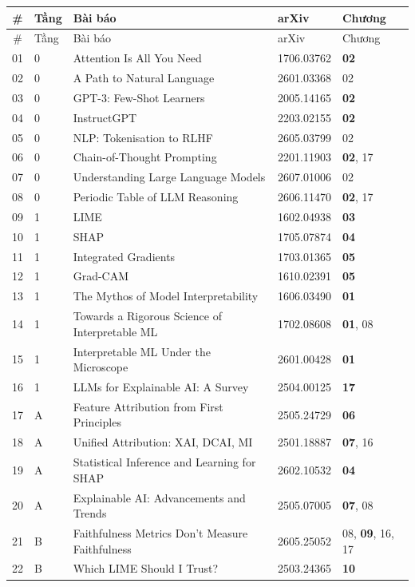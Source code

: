 \footnotesize
\begin{longtable}{@{}clllp{\danhmucwch}@{}}
\toprule
\# & Tầng & Bài báo & arXiv & Chương \\
\midrule
\endfirsthead
\toprule
\# & Tầng & Bài báo & arXiv & Chương \\
\midrule
\endhead
01 & 0 & Attention Is All You Need & 1706.03762 & \textbf{02} \\
02 & 0 & A Path to Natural Language & 2601.03368 & 02 \\
03 & 0 & GPT-3: Few-Shot Learners & 2005.14165 & \textbf{02} \\
04 & 0 & InstructGPT & 2203.02155 & \textbf{02} \\
05 & 0 & NLP: Tokenisation to RLHF & 2605.03799 & 02 \\
06 & 0 & Chain-of-Thought Prompting & 2201.11903 & \textbf{02}, 17 \\
07 & 0 & Understanding Large Language Models & 2607.01006 & 02 \\
08 & 0 & Periodic Table of LLM Reasoning & 2606.11470 & \textbf{02}, 17 \\
09 & 1 & LIME & 1602.04938 & \textbf{03} \\
10 & 1 & SHAP & 1705.07874 & \textbf{04} \\
11 & 1 & Integrated Gradients & 1703.01365 & \textbf{05} \\
12 & 1 & Grad-CAM & 1610.02391 & \textbf{05} \\
13 & 1 & The Mythos of Model Interpretability & 1606.03490 & \textbf{01} \\
14 & 1 & Towards a Rigorous Science of Interpretable ML & 1702.08608 & \textbf{01}, 08 \\
15 & 1 & Interpretable ML Under the Microscope & 2601.00428 & \textbf{01} \\
16 & 1 & LLMs for Explainable AI: A Survey & 2504.00125 & \textbf{17} \\
17 & A & Feature Attribution from First Principles & 2505.24729 & \textbf{06} \\
18 & A & Unified Attribution: XAI, DCAI, MI & 2501.18887 & \textbf{07}, 16 \\
19 & A & Statistical Inference and Learning for SHAP & 2602.10532 & \textbf{04} \\
20 & A & Explainable AI: Advancements and Trends & 2505.07005 & \textbf{07}, 08 \\
21 & B & Faithfulness Metrics Don't Measure Faithfulness & 2605.25052 & 08, \textbf{09}, 16, 17 \\
22 & B & Which LIME Should I Trust? & 2503.24365 & \textbf{10} \\

\end{longtable}
